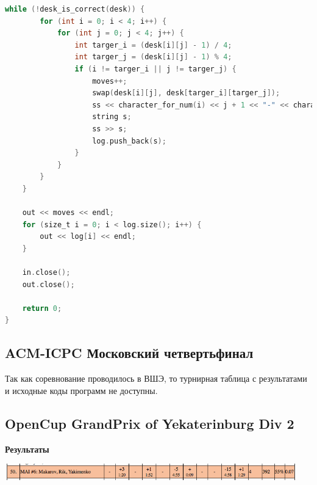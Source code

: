 \documentclass[a4paper,12pt]{article}
\begin{document}
\begin{lstlisting}[language=C]
    while (!desk_is_correct(desk)) {
        for (int i = 0; i < 4; i++) {
            for (int j = 0; j < 4; j++) {
                int targer_i = (desk[i][j] - 1) / 4;
                int targer_j = (desk[i][j] - 1) % 4;
                if (i != targer_i || j != targer_j) {
                    moves++;
                    swap(desk[i][j], desk[targer_i][targer_j]);
                    ss << character_for_num(i) << j + 1 << "-" << character_for_num(targer_i) << targer_j + 1 << endl;
                    string s;
                    ss >> s;
                    log.push_back(s);
                }
            }
        }
    }
    
    out << moves << endl;
    for (size_t i = 0; i < log.size(); i++) {
        out << log[i] << endl;
    }
    
    in.close();
    out.close();
    
    return 0;
}

\end{lstlisting}





%
%
\newpage
\subsection{ACM-ICPC Московский четвертьфинал}

Так как соревнование проводилось в ВШЭ, то турнирная таблица с результатами и исходные коды программ не доступны. \\




%
%
\newpage
\subsection{OpenCup GrandPrix of Yekaterinburg Div 2}

\textbf{{\large Результаты}} \\
\begin{center}
\includegraphics[width=0.95\textwidth]{OC_YKB/result.png}\\ [1cm]
\end{center}
\end{document}
